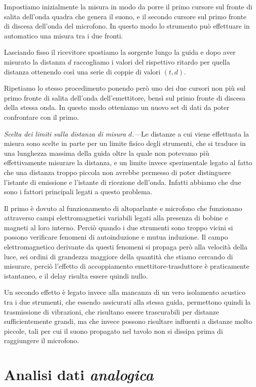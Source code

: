 \documentclass[
    rmp,
    reprint, 
    superscriptaddress, 
    altaffilletter, 
    amsmath, 
    amssymb, 
    a4paper,
    varvw]{revtex4-2}
\begin{document}
Impostiamo inizialmente la misura in modo da porre il primo cursore sul fronte di salita dell'onda quadra che genera il suono, e il secondo cursore sul primo fronte di discesa dell'onda del microfono. In questo modo lo strumento può effettuare in automatico una misura tra i due fronti. 

Lasciando fisso il ricevitore spostiamo la sorgente lungo la guida e dopo aver misurato la distanza $d$ raccogliamo i valori del rispettivo ritardo per quella distanza ottenendo così una serie di coppie di valori $(t,d)$.

Ripetiamo lo stesso procedimento ponendo però uno dei due cursori non più sul primo fronte di salita dell'onda dell'emettitore, bensì sul primo fronte di discesa della stessa onda. In questo modo otteniamo un nuovo set di dati da poter confrontare con il primo. 

\textit{Scelta dei limiti sulla distanza di misura $d$.---}Le distanze a cui viene effettuata la misura sono scelte in parte per un limite fisico degli strumenti, che si traduce in una lunghezza massima della guida oltre la quale non potevamo più effettivamente misurare la distanza, e un limite invece sperimentale legato al fatto che una distanza troppo piccola non avrebbe permesso di poter distinguere l'istante di emissione e l'istante di ricezione dell'onda. Infatti abbiamo che due sono i fattori principali legati a questo problema. 

Il primo è dovuto al funzionamento di altoparlante e microfono che funzionano attraverso campi elettromagnetici variabili legati alla presenza di bobine e magneti al loro interno. Perciò quando i due strumenti sono troppo vicini si possono verificare fenomeni di autoinduzione e mutua induzione. Il campo elettromagnetico derivante da questi fenomeni si propaga però alla velocità della luce, sei ordini di grandezza maggiore della quantità che stiamo cercando di misurare, perciò l'effetto di accoppiamento emettitore-trasduttore è praticamente istantaneo, e il delay risulta essere quindi nullo. 

Un secondo effetto è legato invece alla mancanza di un vero isolamento acustico tra i due strumenti, che essendo assicurati alla stessa guida, permettono quindi la trasmissione di vibrazioni, che risultano essere trascurabili per distanze sufficientemente grandi, ma che invece possono risultare influenti a distanze molto piccole, tali per cui il suono propagato nel tavolo non si dissipa prima di raggiungere il microfono. 

\section{Analisi dati \emph{analogica}}
\end{document}
